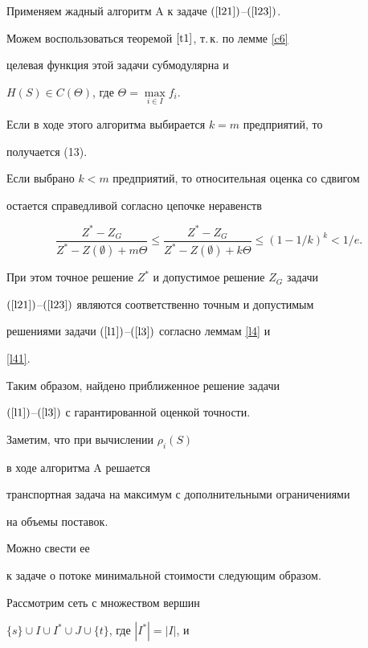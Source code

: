 \begin{pf}


Применяем жадный алгоритм A к задаче $(\ref{l21})$--$(\ref{l23})$.


Можем воспользоваться теоремой $\ref{t1}$, т.\,к. по лемме \ref{c6}


целевая функция этой задачи субмодулярна и 


$H(S) \in C(\Theta)$, где $\Theta = \max\limits_{i \in I}f_i$.


Если в ходе этого алгоритма выбирается $k=m$ предприятий, то


получается (13).


Если выбрано $k<m$ предприятий, то относительная оценка со сдвигом


остается справедливой согласно цепочке неравенств


$$


\frac{Z^* -Z_G}{Z^*-Z(\emptyset)+m\Theta} \le 


\frac{Z^* -Z_G}{Z^*-Z(\emptyset)+k\Theta} 


\le (1 - 1/k)^k < 1/e.


$$


При этом точное решение $Z^*$ и допустимое решение $Z_G$ задачи


$(\ref{l21})$--$(\ref{l23})$ являются соответственно точным и допустимым 


решениями задачи $(\ref{l1})$--$(\ref{l3})$ согласно леммам \ref{l4} и


\ref{l41}.


Таким образом, найдено приближенное решение задачи


$(\ref{l1})$--$(\ref{l3})$ с гарантированной оценкой точности.





Заметим, что при вычислении $\rho_i(S)$ 


в ходе алгоритма A решается


транспортная задача на максимум с дополнительными ограничениями 


на объемы поставок.


Можно свести ее


к задаче о потоке минимальной стоимости следующим образом. 





Рассмотрим сеть с множеством вершин


$\{s \} \cup I \cup I^* \cup J \cup \{ t \}$, где $|I^*|= |I|$, и 



\end{pf}
